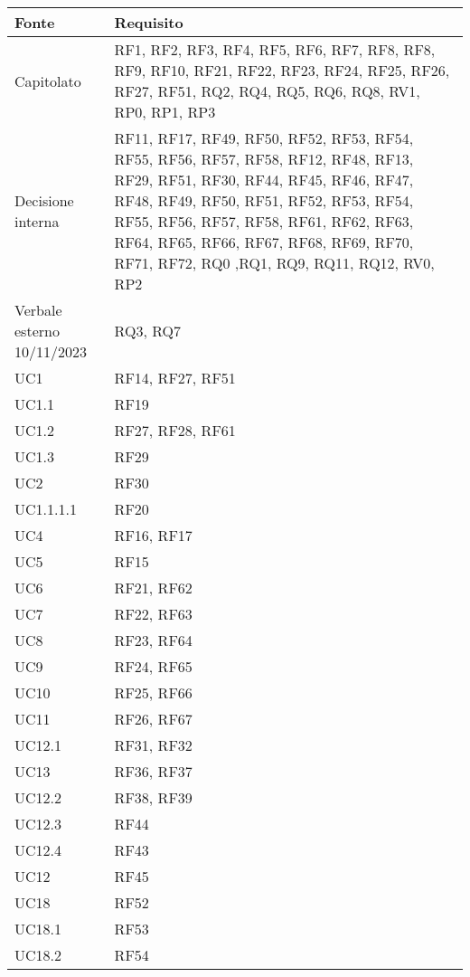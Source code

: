 \begin{center}
  \begin{longtable}{|C{5cm}|C{5cm}|}
    \hline
    \textbf{Fonte} & \textbf{Requisito} \\
    \hline
    Capitolato & RF1, RF2, RF3, RF4, RF5, RF6, RF7, RF8, RF8, RF9, RF10, RF21, RF22, RF23, RF24, RF25, RF26, RF27, RF51, RQ2, RQ4, RQ5, RQ6, RQ8, RV1, RP0, RP1, RP3  \\
    \hline
    Decisione interna & RF11, RF17, RF49, RF50, RF52, RF53, RF54, RF55, RF56, RF57, RF58, RF12, RF48, RF13, RF29, RF51, RF30, RF44, RF45, RF46, RF47, RF48, RF49, RF50, RF51, RF52, RF53, RF54, RF55, RF56, RF57, RF58, RF61, RF62, RF63, RF64, RF65, RF66, RF67, RF68, RF69, RF70, RF71, RF72,  RQ0 ,RQ1, RQ9, RQ11, RQ12, RV0, RP2 \\
    \hline
    Verbale esterno 10/11/2023 & RQ3, RQ7 \\
    \hline
    UC1 & RF14, RF27, RF51 \\
    \hline
    UC1.1 & RF19  \\
    \hline
    UC1.2 & RF27, RF28, RF61 \\
    \hline
    UC1.3 &  RF29 \\
    \hline
    UC2 & RF30 \\
    \hline
    UC1.1.1.1 & RF20 \\
    \hline
    UC4 & RF16, RF17 \\
    \hline
    UC5 & RF15 \\
    \hline
    UC6 & RF21, RF62\\
    \hline
    UC7 & RF22, RF63 \\
    \hline
    UC8 & RF23, RF64 \\
    \hline
    UC9 & RF24, RF65 \\
    \hline
    UC10 & RF25, RF66 \\
    \hline
    UC11 & RF26, RF67 \\
    \hline
    UC12.1 & RF31, RF32 \\
    \hline
    UC13 & RF36, RF37 \\
    \hline
    UC12.2 &  RF38, RF39 \\
    \hline
    UC12.3 & RF44 \\
    \hline
    UC12.4 & RF43 \\
    \hline
    UC12 & RF45 \\
    \hline
    UC18 & RF52 \\
    \hline
    UC18.1 & RF53 \\
    \hline
    UC18.2 & RF54 \\

\end{longtable}
\end{center}
